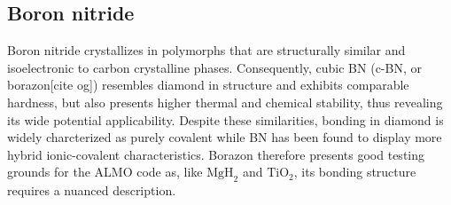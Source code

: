 \documentclass[aps,prb,twocolumn,amsmath,amssymb,superscriptaddress,longbibliography]{revtex4-1}
\newcommand{\Ns}{\mathbb{N}^{*}}
\newcommand{\C}{\mathbb{C}}
\begin{document}





 



\subsection*{Boron nitride}

Boron nitride crystallizes in polymorphs that are structurally similar and isoelectronic to carbon crystalline phases. 
Consequently, cubic BN (c-BN, or borazon[cite og]) resembles diamond in structure and exhibits comparable hardness, but also presents higher thermal and chemical stability, thus revealing its wide potential applicability.
Despite these similarities, bonding in diamond is widely charcterized as purely covalent while BN has been found to display more hybrid ionic-covalent characteristics.
Borazon therefore presents good testing grounds for the ALMO code as, like $\text{MgH}_{2}$ and $\text{TiO}_{2}$, its bonding structure requires a nuanced description.
\end{document}
